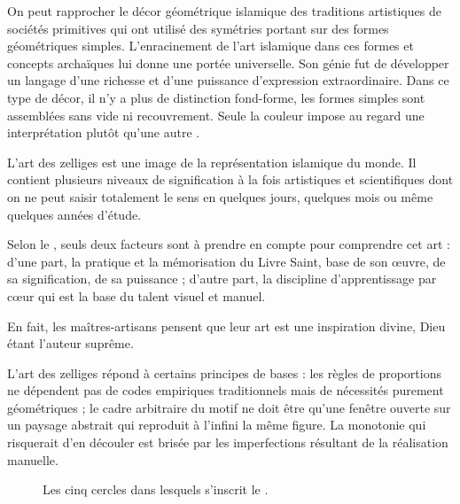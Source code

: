 On peut rapprocher le décor géométrique islamique des traditions 
artistiques de sociétés primitives qui ont utilisé des symétries 
portant sur des formes géométriques simples. L'enracinement de l'art 
islamique dans ces formes et concepts archaïques lui donne une portée 
universelle. Son génie fut de développer un langage d'une richesse et 
d'une puissance d'expression extraordinaire. Dans ce type de décor, 
il n'y a plus de distinction fond-forme, les formes simples sont 
assemblées sans vide ni recouvrement. Seule la couleur impose au 
regard une interprétation plutôt qu'une autre \autocite{Castera_1996}.

L'art des zelliges est une image de la représentation islamique 
du monde. Il contient plusieurs niveaux de signification à la fois 
artistiques et scientifiques dont on ne peut saisir totalement le 
sens en quelques jours, quelques mois ou même quelques années d'étude.

Selon le \maallem {}, seuls deux facteurs sont à 
prendre en compte pour comprendre cet art : d'une part, la pratique et la 
mémorisation du Livre Saint, base de son {\oe}uvre, de sa signification, 
de sa puissance ; d'autre part, la discipline d'apprentissage par c{\oe}ur 
qui est la base du talent visuel et manuel.

En fait, les maîtres-artisans pensent que leur art est une inspiration 
divine, Dieu étant l'auteur suprême.

L'art des zelliges répond à certains principes de bases : les règles 
de proportions ne dépendent pas de codes empiriques traditionnels mais 
de nécessités purement géométriques ; le cadre arbitraire du motif ne 
doit être qu'une fenêtre ouverte sur un paysage abstrait qui reproduit 
à l'infini la même figure. La monotonie qui risquerait d'en découler 
est brisée par les imperfections résultant de la réalisation manuelle.

\begin{figure}[htb]
  \caption{Les cinq cercles dans lesquels s'inscrit le \hatim 
           \autocite{Castera_1996}.{}}
  \label{fig:cercle}
\end{figure}

